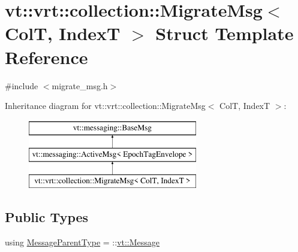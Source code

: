 \hypertarget{structvt_1_1vrt_1_1collection_1_1_migrate_msg}{}\section{vt\+:\+:vrt\+:\+:collection\+:\+:Migrate\+Msg$<$ ColT, IndexT $>$ Struct Template Reference}
\label{structvt_1_1vrt_1_1collection_1_1_migrate_msg}


{\ttfamily \#include $<$migrate\+\_\+msg.\+h$>$}

Inheritance diagram for vt\+:\+:vrt\+:\+:collection\+:\+:Migrate\+Msg$<$ ColT, IndexT $>$\+:\begin{figure}[H]
\begin{center}
\leavevmode
\includegraphics[height=3.000000cm]{structvt_1_1vrt_1_1collection_1_1_migrate_msg}
\end{center}
\end{figure}
\subsection*{Public Types}
\begin{DoxyCompactItemize}
\item 
using \hyperlink{structvt_1_1vrt_1_1collection_1_1_migrate_msg_a3453db7704db7db17a7afef046dba844}{Message\+Parent\+Type} = \+::\hyperlink{namespacevt_a3a3ddfef40b4c90915fa43cdd5f129ea}{vt\+::\+Message}
\end{DoxyCompactItemize}
